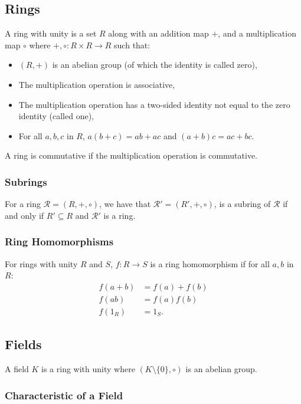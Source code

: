 \newpage

\subsection{Rings}

A ring with unity is a set $R$ along with an addition map $+$, and
a multiplication map $\circ$ where $+, \circ : R \times R \to R$
such that: \begin{itemize}
  \item $(R, +)$ is an abelian group (of which the identity is called zero),
  \item The multiplication operation is associative,
  \item The multiplication operation has a two-sided identity not equal
  to the zero identity (called one),
  \item For all $a, b, c$ in $R$, $a(b+c) = ab + ac$ and $(a+b)c = ac + bc$.
\end{itemize} A ring is commutative if the multiplication operation is commutative.

\subsubsection{Subrings}

For a ring $\mathcal{R} = (R, +, \circ)$, we have that $\mathcal{R}' = (R', +, \circ)$, 
is a subring of $\mathcal{R}$ if and only if $R' \subseteq R$ and $\mathcal{R}'$ is a ring.

\subsubsection{Ring Homomorphisms}

For rings with unity $R$ and $S$, $f : R \to S$ is a ring homomorphism if for all
$a, b$ in $R$: \begin{align*}
  f(a + b) &= f(a) + f(b) \\
  f(ab) &= f(a)f(b) \\
  f(1_R) &= 1_S.
\end{align*}

\newpage

\subsection{Fields}

A field $K$ is a ring with unity where $(K\setminus\{0\}, \circ)$ 
is an abelian group.

\subsubsection{Characteristic of a Field}

